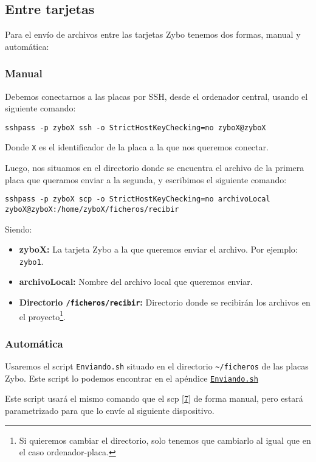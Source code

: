 \newpage
\subsection{Entre tarjetas}
Para el envío de archivos entre las tarjetas Zybo tenemos dos formas, manual y automática:

\subsubsection{Manual}
Debemos conectarnos a las placas por SSH, desde el ordenador central, usando el siguiente comando:
\begin{center}
	\texttt{sshpass -p zyboX ssh -o StrictHostKeyChecking=no zyboX@zyboX}
\end{center}
Donde \texttt{X} es el identificador de la placa a la que nos queremos conectar.

Luego, nos situamos en el directorio donde se encuentra el archivo de la primera placa que queramos enviar a la segunda, y escribimos el siguiente comando:
\begin{center}
	\texttt{sshpass -p zyboX scp -o StrictHostKeyChecking=no archivoLocal zyboX@zyboX:/home/zyboX/ficheros/recibir}
\end{center}
Siendo:
\begin{itemize}
	\item \textbf{zyboX:} La tarjeta Zybo a la que queremos enviar el archivo. Por ejemplo: \texttt{zybo1}.
	\item \textbf{archivoLocal:} Nombre del archivo local que queremos enviar.
	\item \textbf{Directorio \texttt{/ficheros/recibir}:} Directorio donde se recibirán los archivos en el proyecto\footnote{Si quieremos cambiar el directorio, solo tenemos que cambiarlo al igual que en el caso ordenador-placa.}.
\end{itemize}

\subsubsection{Automática}
Usaremos el script \texttt{Enviando.sh} situado en el directorio \texttt{\textasciitilde{}/ficheros} de las placas Zybo.
Este script lo podemos encontrar en el apéndice \hyperlink{ScriptEnviando}{\texttt{Enviando.sh}}

Este script usará el mismo comando que el scp \hyperlink{7}{[7]} de forma manual, pero estará parametrizado para que lo envíe al siguiente dispositivo.